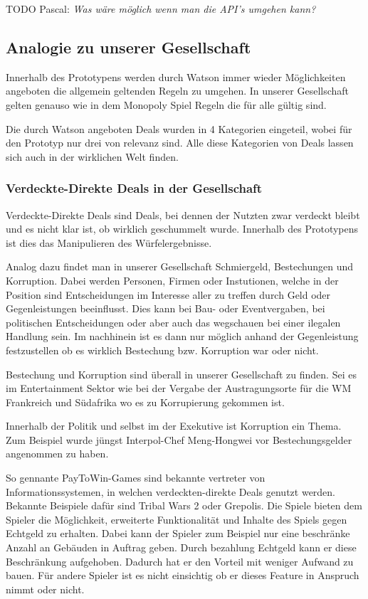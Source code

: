 \documentclass[german]{cgspaper} %
\newcommand{\todo}[1]{\textit{#1}}
\newcommand{\Pascal}[1]{\textcolor{colorPascal}{TODO Pascal:} \todo{#1} }
\begin{document}
\Pascal{Was wäre möglich wenn man die API's umgehen kann?}

\subsection{Analogie zu unserer Gesellschaft}

Innerhalb des Prototypens werden durch Watson immer wieder Möglichkeiten angeboten die allgemein geltenden Regeln zu umgehen.
In unserer Gesellschaft gelten genauso wie in dem Monopoly Spiel Regeln die für alle gültig sind.

Die durch Watson angeboten Deals wurden in 4 Kategorien eingeteil, wobei für den Prototyp nur drei von relevanz sind.
Alle diese Kategorien von Deals lassen sich auch in der wirklichen Welt finden.

\subsubsection{Verdeckte-Direkte Deals in der Gesellschaft}

Verdeckte-Direkte Deals sind Deals, bei dennen der Nutzten zwar verdeckt bleibt und es nicht klar ist, ob wirklich geschummelt wurde.
Innerhalb des Prototypens ist dies das Manipulieren des Würfelergebnisse. 

Analog dazu findet man in unserer Gesellschaft Schmiergeld, Bestechungen und Korruption.
Dabei werden Personen, Firmen oder Instutionen, welche in der Position sind Entscheidungen im Interesse aller zu treffen durch Geld oder Gegenleistungen beeinflusst.
Dies kann bei Bau- oder Eventvergaben, bei politischen Entscheidungen oder aber auch das wegschauen bei einer ilegalen Handlung sein.
Im nachhinein ist es dann nur möglich anhand der Gegenleistung festzustellen ob es wirklich Bestechung bzw. Korruption war oder nicht.

Bestechung und Korruption sind überall in unserer Gesellschaft zu finden.
Sei es im Entertainment Sektor wie bei der Vergabe der Austragungsorte für die WM Frankreich und Südafrika wo es zu Korrupierung gekommen ist. \cite{FAZWM2015}

Innerhalb der Politik und selbst im der Exekutive ist Korruption ein Thema.
Zum Beispiel wurde jüngst Interpol-Chef Meng-Hongwei vor Bestechungsgelder angenommen zu haben. \cite{NTVINTERPOL2018}

So gennante PayToWin-Games sind bekannte vertreter von Informationssystemen, in welchen verdeckten-direkte Deals genutzt werden.
Bekannte Beispiele dafür sind Tribal Wars 2 oder Grepolis.
Die Spiele bieten dem Spieler die Möglichkeit, erweiterte Funktionalität und Inhalte des Spiels gegen Echtgeld zu erhalten.
Dabei kann der Spieler zum Beispiel nur eine beschränke Anzahl an Gebäuden in Auftrag geben.
Durch bezahlung Echtgeld kann er diese Beschränkung aufgehoben.
Dadurch hat er den Vorteil mit weniger Aufwand zu bauen.
Für andere Spieler ist es nicht einsichtig ob er dieses Feature in Anspruch nimmt oder nicht.
\end{document}
